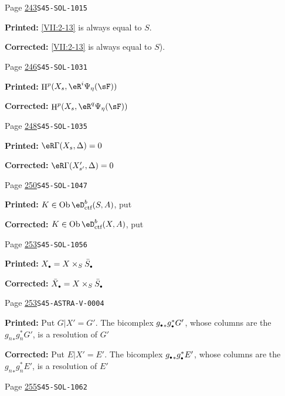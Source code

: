 \documentclass[oneside]{book}
\DeclareMathOperator{\h}{H}
\DeclareMathOperator{\ob}{Ob}
\theoremstyle{sga-source}
\theoremstyle{sga-source-dash}
\theoremstyle{sga-source-dotdash}
\theoremstyle{sga-source-number-note-dash}
\theoremstyle{sga-source-note-number-dotdash}
\theoremstyle{sga-source-example-dotdash}
\theoremstyle{sga-source-inline-number}
\theoremstyle{sga-source-bare-number}
\theoremstyle{sga-source}
\let\oldbullet\bullet
\renewcommand{\bullet}{\textnormal{\tiny$\oldbullet$}}
\begin{document}
\begin{description}
\smallskip
\item[\hypertarget{apparatus:EN-0175}{175}] Page \hyperlink{printpage:en:243}{243}\quad\texttt{S45-SOL-1015}
\par\noindent\textbf{Printed:} \ref{VII:2-13} is always equal to $S$.
\par\noindent\textbf{Corrected:} \ref{VII:2-13} is always equal to $S$).
\smallskip
\item[\hypertarget{apparatus:EN-0176}{176}] Page \hyperlink{printpage:en:246}{246}\quad\texttt{S45-SOL-1031}
\par\noindent\textbf{Printed:} \(\h^p(X_s,\eR^i\Psi_\eta(\sF))\)
\par\noindent\textbf{Corrected:} \(\h^p(X_s,\eR^q\Psi_\eta(\sF))\)
\smallskip
\item[\hypertarget{apparatus:EN-0177}{177}] Page \hyperlink{printpage:en:248}{248}\quad\texttt{S45-SOL-1035}
\par\noindent\textbf{Printed:} $\eR\Gamma(X_s,\Delta)=0$
\par\noindent\textbf{Corrected:} $\eR\Gamma(X_{s'}',\Delta)=0$
\smallskip
\item[\hypertarget{apparatus:EN-0178}{178}] Page \hyperlink{printpage:en:250}{250}\quad\texttt{S45-SOL-1047}
\par\noindent\textbf{Printed:} $K\in\ob\eD_\text{ctf}^b(S,A)$, put
\par\noindent\textbf{Corrected:} $K\in\ob\eD_\text{ctf}^b(X,A)$, put
\smallskip
\item[\hypertarget{apparatus:EN-0179}{179}] Page \hyperlink{printpage:en:253}{253}\quad\texttt{S45-SOL-1056}
\par\noindent\textbf{Printed:} \(X_\bullet=X\times_S \bar S_\bullet\)
\par\noindent\textbf{Corrected:} \(\bar X_\bullet=X\times_S \bar S_\bullet\)
\smallskip
\item[\hypertarget{apparatus:EN-0180}{180}] Page \hyperlink{printpage:en:253}{253}\quad\texttt{S45-ASTRA-V-0004}
\par\noindent\textbf{Printed:} Put
$G|X'=G'$. The bicomplex ${g_\bullet}_\ast g_\bullet^\ast G'$, whose columns
are the ${g_n}_\ast g_n^\ast G'$, is a resolution of $G'$
\par\noindent\textbf{Corrected:} Put
$E|X'=E'$. The bicomplex ${g_\bullet}_\ast g_\bullet^\ast E'$, whose columns
are the ${g_n}_\ast g_n^\ast E'$, is a resolution of $E'$
\smallskip
\item[\hypertarget{apparatus:EN-0181}{181}] Page \hyperlink{printpage:en:255}{255}\quad\texttt{S45-SOL-1062}

\end{description}
\end{document}
